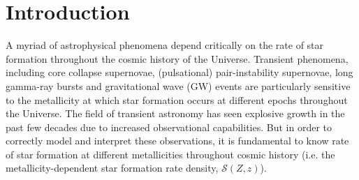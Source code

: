\documentclass[twocolumn]{aastex631}
\newcommand{\SFRDzZ}{\ensuremath{\mathcal{S}(Z,z)}\xspace}
\begin{document}


\section{Introduction \label{sec: intro}}



A myriad of astrophysical phenomena depend critically on the rate of star formation throughout the cosmic history of the Universe. 
Transient phenomena, including core collapse supernovae, (pulsational) pair-instability supernovae, long gamma-ray bursts and gravitational wave (GW) events are particularly sensitive to the metallicity at which star formation occurs at different epochs throughout the Universe.
The field of transient astronomy has seen explosive growth in the past few decades due to increased observational capabilities. But in order to correctly model and interpret these observations, it is fundamental to know rate of star formation at different metallicities throughout cosmic history (i.e. the metallicity-dependent star formation rate density, \SFRDzZ).
\end{document}
